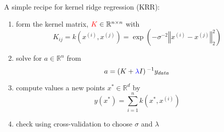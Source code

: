 A simple recipe for {\color{red}kernel} {\color{blue}ridge} regression (KRR):\\
\begin{enumerate}
	\pause{}
	\item form the kernel matrix, $\color{red}K\color{black}\in\mathbb{R}^{n\times n}$ with \[K_{ij}=k(x^{(i)},x^{(j)})= \exp\left(-\sigma^{-2}\left\Vert x^{(i)}-x^{(j)} \right\Vert_2^2 \right)\]	\pause{}
	\item solve for $a\in\mathbb{R}^{n}$ from \[a=\left(K + \color{blue}\lambda\color{black} I\right)^{-1}y_{data}\]	\pause{}
	\item compute values a new points $x^{*}\in \mathbb{R}^{d}$ by\[ y(x^{*})=\sum_{i=1}^{n}k(x^{*},x^{(i)})\]	\pause{}
	\item check using cross-validation to choose $\sigma$ and $\lambda$
\end{enumerate}